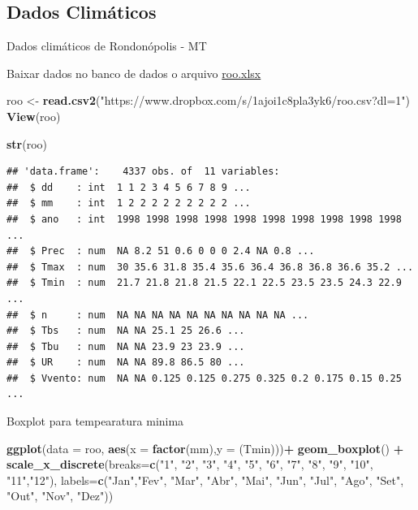 \documentclass[
]{book}
\newenvironment{Shaded}{\begin{snugshade}}{\end{snugshade}}
\newcommand{\DataTypeTok}[1]{\textcolor[rgb]{0.13,0.29,0.53}{#1}}
\newcommand{\KeywordTok}[1]{\textcolor[rgb]{0.13,0.29,0.53}{\textbf{#1}}}
\newcommand{\NormalTok}[1]{#1}
\newcommand{\OperatorTok}[1]{\textcolor[rgb]{0.81,0.36,0.00}{\textbf{#1}}}
\newcommand{\StringTok}[1]{\textcolor[rgb]{0.31,0.60,0.02}{#1}}
\begin{document}
\hypertarget{dados-climuxe1ticos}{%
\subsection{Dados Climáticos}\label{dados-climuxe1ticos}}

Dados climáticos de Rondonópolis - MT

Baixar dados no banco de dados o arquivo \href{https://www.dropbox.com/s/1ajoi1c8pla3yk6/roo.csv?dl=1}{roo.xlsx}

\begin{Shaded}
\begin{Highlighting}[]
\NormalTok{roo <-}\StringTok{ }\KeywordTok{read.csv2}\NormalTok{(}\StringTok{"https://www.dropbox.com/s/1ajoi1c8pla3yk6/roo.csv?dl=1"}\NormalTok{)}
\KeywordTok{View}\NormalTok{(roo)}

\KeywordTok{str}\NormalTok{(roo)}
\end{Highlighting}
\end{Shaded}

\begin{verbatim}
## 'data.frame':    4337 obs. of  11 variables:
##  $ dd    : int  1 1 2 3 4 5 6 7 8 9 ...
##  $ mm    : int  1 2 2 2 2 2 2 2 2 2 ...
##  $ ano   : int  1998 1998 1998 1998 1998 1998 1998 1998 1998 1998 ...
##  $ Prec  : num  NA 8.2 51 0.6 0 0 0 2.4 NA 0.8 ...
##  $ Tmax  : num  30 35.6 31.8 35.4 35.6 36.4 36.8 36.8 36.6 35.2 ...
##  $ Tmin  : num  21.7 21.8 21.8 21.5 22.1 22.5 23.5 23.5 24.3 22.9 ...
##  $ n     : num  NA NA NA NA NA NA NA NA NA NA ...
##  $ Tbs   : num  NA NA 25.1 25 26.6 ...
##  $ Tbu   : num  NA NA 23.9 23 23.9 ...
##  $ UR    : num  NA NA 89.8 86.5 80 ...
##  $ Vvento: num  NA NA 0.125 0.125 0.275 0.325 0.2 0.175 0.15 0.25 ...
\end{verbatim}

Boxplot para tempearatura minima

\begin{Shaded}
\begin{Highlighting}[]
\KeywordTok{ggplot}\NormalTok{(}\DataTypeTok{data =}\NormalTok{ roo, }\KeywordTok{aes}\NormalTok{(}\DataTypeTok{x =} \KeywordTok{factor}\NormalTok{(mm),}\DataTypeTok{y =}\NormalTok{ (Tmin)))}\OperatorTok{+}
\StringTok{  }\KeywordTok{geom_boxplot}\NormalTok{() }\OperatorTok{+}
\StringTok{  }\KeywordTok{scale_x_discrete}\NormalTok{(}\DataTypeTok{breaks=}\KeywordTok{c}\NormalTok{(}\StringTok{"1"}\NormalTok{, }\StringTok{"2"}\NormalTok{, }\StringTok{"3"}\NormalTok{, }\StringTok{"4"}\NormalTok{, }\StringTok{"5"}\NormalTok{, }\StringTok{"6"}\NormalTok{, }\StringTok{"7"}\NormalTok{, }\StringTok{"8"}\NormalTok{, }\StringTok{"9"}\NormalTok{, }\StringTok{"10"}\NormalTok{, }\StringTok{"11"}\NormalTok{,}\StringTok{"12"}\NormalTok{),}
            \DataTypeTok{labels=}\KeywordTok{c}\NormalTok{(}\StringTok{"Jan"}\NormalTok{,}\StringTok{"Fev"}\NormalTok{, }\StringTok{"Mar"}\NormalTok{, }\StringTok{"Abr"}\NormalTok{, }\StringTok{"Mai"}\NormalTok{, }\StringTok{"Jun"}\NormalTok{, }\StringTok{"Jul"}\NormalTok{, }\StringTok{"Ago"}\NormalTok{, }\StringTok{"Set"}\NormalTok{, }\StringTok{"Out"}\NormalTok{, }\StringTok{"Nov"}\NormalTok{, }\StringTok{"Dez"}\NormalTok{))}
\end{Highlighting}
\end{Shaded}
\end{document}
